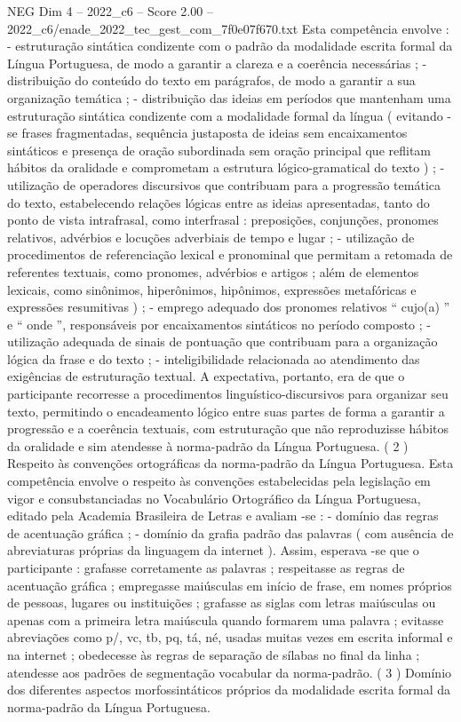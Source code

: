 \begin{textsample}{NEG Dim 4 – 2022\_c6 – Score 2.00 – 2022\_c6/enade\_2022\_tec\_gest\_com\_7f0e07f670.txt}
Esta competência envolve : - estruturação sintática condizente com o padrão da modalidade escrita formal da Língua Portuguesa, de modo a garantir a clareza e a coerência necessárias ; - distribuição do conteúdo do texto em parágrafos, de modo a garantir a sua organização temática ; - distribuição das ideias em períodos que mantenham uma estruturação sintática condizente com a modalidade formal da língua ( evitando -se frases fragmentadas, sequência justaposta de ideias sem encaixamentos sintáticos e presença de oração subordinada sem oração principal que reflitam hábitos da oralidade e comprometam a estrutura lógico-gramatical do texto ) ; - utilização de operadores discursivos que contribuam para a progressão temática do texto, estabelecendo relações lógicas entre as ideias apresentadas, tanto do ponto de vista intrafrasal, como interfrasal : preposições, conjunções, pronomes relativos, advérbios e locuções adverbiais de tempo e lugar ; - utilização de procedimentos de referenciação lexical e pronominal que permitam a retomada de referentes textuais, como pronomes, advérbios e artigos ; além de elementos lexicais, como sinônimos, hiperônimos, hipônimos, expressões metafóricas e expressões resumitivas ) ; - emprego adequado dos pronomes relativos “ cujo(a) ” e “ onde ”, responsáveis por encaixamentos sintáticos no período composto ; - utilização adequada de sinais de pontuação que contribuam para a organização lógica da frase e do texto ; - inteligibilidade relacionada ao atendimento das exigências de estruturação textual.
A expectativa, portanto, era de que o participante recorresse a procedimentos linguístico-discursivos para organizar seu texto, permitindo o encadeamento lógico entre suas partes de forma a garantir a progressão e a coerência textuais, com estruturação que não reproduzisse hábitos da oralidade e sim atendesse à norma-padrão da Língua Portuguesa. ( 2 ) Respeito às convenções ortográficas da norma-padrão da Língua Portuguesa.
Esta competência envolve o respeito às convenções estabelecidas pela legislação em vigor e consubstanciadas no Vocabulário Ortográfico da Língua Portuguesa, editado pela Academia Brasileira de Letras e avaliam -se : - domínio das regras de acentuação gráfica ; - domínio da grafia padrão das palavras ( com ausência de abreviaturas próprias da linguagem da internet ).
Assim, esperava -se que o participante : grafasse corretamente as palavras ; respeitasse as regras de acentuação gráfica ; empregasse maiúsculas em início de frase, em nomes próprios de pessoas, lugares ou instituições ; grafasse as siglas com letras maiúsculas ou apenas com a primeira letra maiúscula quando formarem uma palavra ; evitasse abreviações como p/, vc, tb, pq, tá, né, usadas muitas vezes em escrita informal e na internet ; obedecesse às regras de separação de sílabas no final da linha ; atendesse aos padrões de segmentação vocabular da norma-padrão. ( 3 ) Domínio dos diferentes aspectos morfossintáticos próprios da modalidade escrita formal da norma-padrão da Língua Portuguesa.

\end{textsample}
